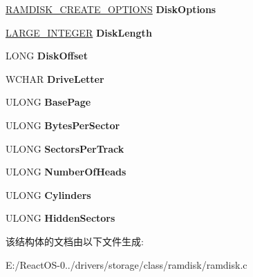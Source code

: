 \begin{DoxyCompactItemize}
\hyperlink{struct___r_a_m_d_i_s_k___c_r_e_a_t_e___o_p_t_i_o_n_s}{R\+A\+M\+D\+I\+S\+K\+\_\+\+C\+R\+E\+A\+T\+E\+\_\+\+O\+P\+T\+I\+O\+NS} {\bfseries Disk\+Options}
\item 
\mbox{\label{struct___r_a_m_d_i_s_k___d_r_i_v_e___e_x_t_e_n_s_i_o_n_a0b7bcef2474169ac53bfbeda5914a621}} 
\hyperlink{union___l_a_r_g_e___i_n_t_e_g_e_r}{L\+A\+R\+G\+E\+\_\+\+I\+N\+T\+E\+G\+ER} {\bfseries Disk\+Length}
\item 
\mbox{\label{struct___r_a_m_d_i_s_k___d_r_i_v_e___e_x_t_e_n_s_i_o_n_a27154f3bc886bc6ac137c6e818f7dd9b}} 
L\+O\+NG {\bfseries Disk\+Offset}
\item 
\mbox{\label{struct___r_a_m_d_i_s_k___d_r_i_v_e___e_x_t_e_n_s_i_o_n_abf1b070a3e089ee3e637cf47afde12b4}} 
W\+C\+H\+AR {\bfseries Drive\+Letter}
\item 
\mbox{\label{struct___r_a_m_d_i_s_k___d_r_i_v_e___e_x_t_e_n_s_i_o_n_a98b5ec1c1af7530f83dfed90d138b460}} 
U\+L\+O\+NG {\bfseries Base\+Page}
\item 
\mbox{\label{struct___r_a_m_d_i_s_k___d_r_i_v_e___e_x_t_e_n_s_i_o_n_acbedfeda083371c655cd9a4155a42f15}} 
U\+L\+O\+NG {\bfseries Bytes\+Per\+Sector}
\item 
\mbox{\label{struct___r_a_m_d_i_s_k___d_r_i_v_e___e_x_t_e_n_s_i_o_n_a2e23939cef2ae0db6d7bbfaf747a2913}} 
U\+L\+O\+NG {\bfseries Sectors\+Per\+Track}
\item 
\mbox{\label{struct___r_a_m_d_i_s_k___d_r_i_v_e___e_x_t_e_n_s_i_o_n_a039620b17d5d65ce2fffa02f96726af2}} 
U\+L\+O\+NG {\bfseries Number\+Of\+Heads}
\item 
\mbox{\label{struct___r_a_m_d_i_s_k___d_r_i_v_e___e_x_t_e_n_s_i_o_n_ab28390dbf216072b21a36cb5a6bd46e4}} 
U\+L\+O\+NG {\bfseries Cylinders}
\item 
\mbox{\label{struct___r_a_m_d_i_s_k___d_r_i_v_e___e_x_t_e_n_s_i_o_n_ab6ae2ffe1abf5fc855df9fd55bc0f0a9}} 
U\+L\+O\+NG {\bfseries Hidden\+Sectors}
\end{DoxyCompactItemize}


该结构体的文档由以下文件生成\+:\begin{DoxyCompactItemize}
\item 
E\+:/\+React\+O\+S-\/0../drivers/storage/class/ramdisk/ramdisk.\+c\end{DoxyCompactItemize}
